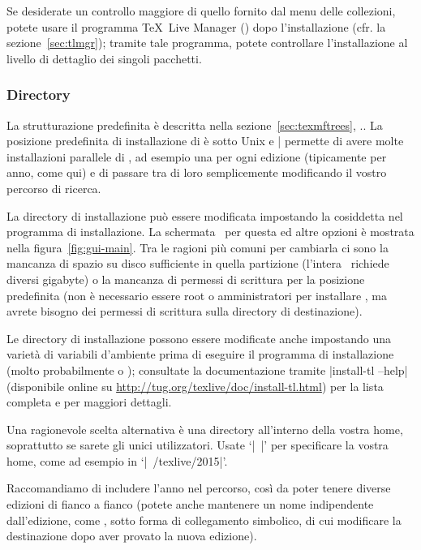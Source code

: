 \documentclass{article}
\begin{document}
Se desiderate un controllo maggiore di quello fornito dal menu delle
collezioni, potete usare il programma \TeX\ Live Manager ()
dopo l'installazione (cfr. la sezione~\ref{sec:tlmgr}); tramite tale
programma, potete controllare l'installazione al livello di dettaglio dei
singoli pacchetti.

\subsubsection{Directory}
\label{sec:directories}

La strutturazione predefinita è descritta nella
sezione~\ref{sec:texmftrees}, \p.\pageref{sec:texmftrees}. La posizione
predefinita di installazione di  è
 sotto
Unix e |%
permette di avere molte installazioni parallele di \TL, ad esempio una per
ogni edizione (tipicamente per anno, come qui) e di passare tra di loro
semplicemente modificando il vostro percorso di ricerca.

La directory di installazione può essere modificata impostando la
cosiddetta  nel programma di installazione. La schermata
\GUI\ per questa ed altre opzioni è mostrata nella
figura~\ref{fig:gui-main}. Tra le ragioni più comuni per cambiarla ci sono
la mancanza di spazio su disco sufficiente in quella partizione (l'intera
\TL\ richiede diversi gigabyte) o la mancanza di permessi di scrittura per
la posizione predefinita (non è necessario essere root o amministratori
per installare \TL, ma avrete bisogno dei permessi di scrittura sulla
directory di destinazione).

Le directory di installazione possono essere modificate anche impostando
una varietà di variabili d'ambiente prima di eseguire il programma di
installazione (molto probabilmente  o
); consultate la documentazione tramite
|install-tl --help| (disponibile online su
\url{http://tug.org/texlive/doc/install-tl.html}) per la lista completa e
per maggiori dettagli.

Una ragionevole scelta alternativa è una directory all'interno della
vostra home, soprattutto se sarete gli unici utilizzatori. Usate `|~|'
per specificare la vostra home, come ad esempio in `|~/texlive/2015|'.

Raccomandiamo di includere l'anno nel percorso, così da poter tenere
diverse edizioni di \TL{} fianco a fianco (potete anche mantenere un nome
indipendente dall'edizione, come , sotto
forma di collegamento simbolico, di cui modificare la destinazione dopo
aver provato la nuova edizione).
\end{document}
